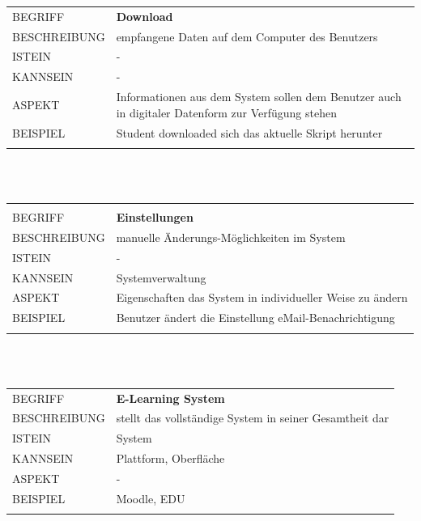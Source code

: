 \documentclass[12pt,a4paper]{article}
\begin{document}
\begin{tabular}{l p{12cm}}
BEGRIFF 	 & \textbf{Download} \\ 
BESCHREIBUNG & empfangene Daten auf dem Computer des Benutzers\\ 
ISTEIN   	 & -\\
KANNSEIN 	 & -\\ 
ASPEKT   	 & Informationen aus dem System sollen dem Benutzer auch in digitaler Datenform zur Verfügung stehen\\
BEISPIEL 	 & Student downloaded sich das aktuelle Skript herunter\\\\
\hline
\end{tabular}\\\\  

\begin{tabular}{l p{12cm}}
\hline\\
BEGRIFF 	 & \textbf{Einstellungen} \\ 
BESCHREIBUNG & manuelle Änderungs-Möglichkeiten im System \\
ISTEIN   	 & -\\
KANNSEIN 	 & Systemverwaltung\\ 
ASPEKT   	 & Eigenschaften das System in individueller Weise zu ändern\\ 
BEISPIEL 	 & Benutzer ändert die Einstellung eMail-Benachrichtigung\\\\
\hline
\end{tabular}\\\\  

\begin{tabular}{l p{12cm}}
BEGRIFF 	 & \textbf{E-Learning System} \\ 
BESCHREIBUNG & stellt das vollständige System in seiner Gesamtheit dar\\ 
ISTEIN   	 & System\\
KANNSEIN 	 & Plattform, Oberfläche\\ 
ASPEKT   	 & -\\
BEISPIEL 	 & Moodle, EDU\\\\
\hline
\end{tabular}\\\\  
\end{document}
